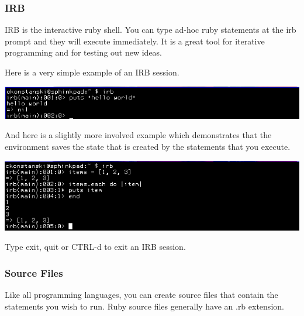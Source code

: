 \documentclass[helvetica,english,utf8,notitle,nologo]{beamer}
\begin{document}
\begin{frame}
  \frametitle{IRB}

  IRB is the interactive ruby shell. You can type ad-hoc ruby
  statements at the irb prompt and they will execute immediately. It
  is a great tool for iterative programming and for testing out new
  ideas.

  Here is a very simple example of an IRB session.

  \includegraphics[scale=0.5]{irb_1}

  And here is a slightly more involved example which demonstrates that
  the environment saves the state that is created by the statements
  that you execute.

  \includegraphics[scale=0.5]{irb_2}

  Type exit, quit or CTRL-d to exit an IRB session.
\end{frame}

\begin{frame}
  \frametitle{Source Files}

  Like all programming languages, you can create source files that
  contain the statements you wish to run. Ruby source files generally
  have an .rb extension.
  
  
  
\end{frame}
\end{document}
